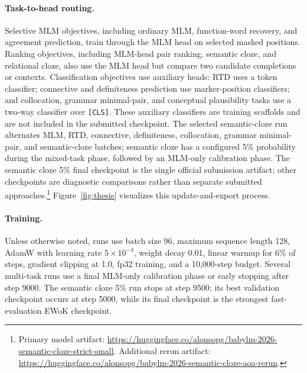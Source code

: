 \documentclass[11pt]{article}
\begin{document}
\paragraph{Task-to-head routing.}
Selective MLM objectives, including ordinary MLM, function-word recovery, and agreement prediction, train through the MLM head on selected masked positions.
Ranking objectives, including MLM-head pair ranking, semantic cloze, and relational cloze, also use the MLM head but compare two candidate completions or contexts.
Classification objectives use auxiliary heads: RTD uses a token classifier; connective and definiteness prediction use marker-position classifiers; and collocation, grammar minimal-pair, and conceptual plausibility tasks use a two-way classifier over \texttt{[CLS]}.
These auxiliary classifiers are training scaffolds and are not included in the submitted checkpoint.
The selected semantic-cloze run alternates MLM, RTD, connective, definiteness, collocation, grammar minimal-pair, and semantic-cloze batches; semantic cloze has a configured 5\% probability during the mixed-task phase, followed by an MLM-only calibration phase.
The semantic cloze 5\% final checkpoint is the single official submission artifact; other checkpoints are diagnostic comparisons rather than separate submitted approaches.\footnote{Primary model artifact: \url{https://huggingface.co/alonsopg/babylm-2026-semantic-cloze-strict-small}. Additional rerun artifact: \url{https://huggingface.co/alonsopg/babylm-2026-semantic-cloze-aoa-rerun}.}
Figure~\ref{fig:thesis} visualizes this update-and-export process.

\paragraph{Training.}
Unless otherwise noted, runs use batch size 96, maximum sequence length 128, AdamW with learning rate $5\times10^{-4}$, weight decay 0.01, linear warmup for 6\% of steps, gradient clipping at 1.0, fp32 training, and a 10,000-step budget.
Several multi-task runs use a final MLM-only calibration phase or early stopping after step 9000.
The semantic cloze 5\% run stops at step 9500; its best validation checkpoint occurs at step 5000, while its final checkpoint is the strongest fast-evaluation EWoK checkpoint.
\end{document}
